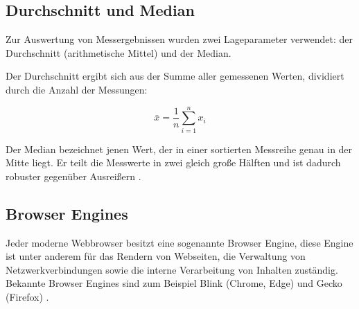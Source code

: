 \subsection{Durchschnitt und Median}
Zur Auswertung von Messergebnissen wurden zwei Lageparameter verwendet: der Durchschnitt (arithmetische Mittel) und der Median. 

Der Durchschnitt ergibt sich aus der Summe aller gemessenen Werten, dividiert durch die Anzahl der Messungen:

\[
\bar{x} = \frac{1}{n} \sum_{i=1}^n x_i
\]

Der Median bezeichnet jenen Wert, der in einer sortierten Messreihe genau in der Mitte liegt. Er teilt die Messwerte in zwei gleich große Hälften und ist dadurch robuster gegenüber Ausreißern \parencite{ludwig-mayerhofer-statistik}.

\subsection{Browser Engines}
Jeder moderne Webbrowser besitzt eine sogenannte Browser Engine, diese Engine ist unter anderem für das Rendern von Webseiten, die Verwaltung von Netzwerkverbindungen sowie die interne Verarbeitung von Inhalten zuständig. 
Bekannte Browser Engines sind zum Beispiel Blink (Chrome, Edge) und Gecko (Firefox)
 \parencite{browser-engines}.


\chapterend